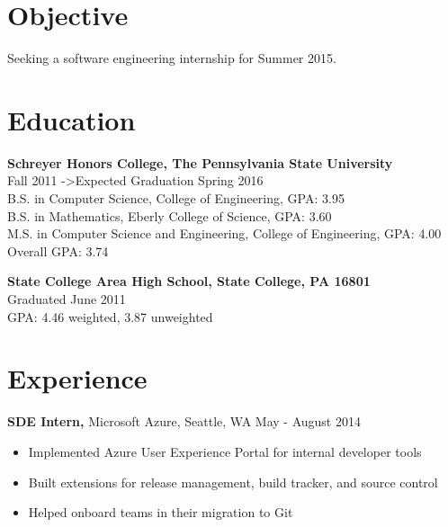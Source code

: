 \documentclass[margin]{res}
\begin{document}
 
\address{{\bf Present Address} \\ 9052 E Shorewood Dr \\ Apartment 255 \\ Mercer Island, WA 98040 \\
        (814) 574-8768 }
\address{{\bf Permanent Address} \\ 3144 Williamsburg Court \\ State College, PA 16801 \\ (814) 574-0111 \\ douglasjordan0@gmail.com } 
\begin{resume} 
 
\section{Objective} 
Seeking a software engineering internship for Summer 2015.

\section{Education} 
{\bf Schreyer Honors College, The Pennsylvania State University} \\
Fall 2011 -\textgreater Expected Graduation Spring 2016 \\
B.S. in Computer Science, College of Engineering, GPA: 3.95 \\
B.S. in Mathematics, Eberly College of Science, GPA: 3.60 \\
M.S. in Computer Science and Engineering, College of Engineering, GPA: 4.00 \\
Overall GPA: 3.74

{\bf State College Area High School, State College, PA 16801} \\
Graduated June 2011 \\
GPA: 4.46 weighted, 3.87 unweighted

\section{Experience}

{\bf SDE Intern,} Microsoft Azure, Seattle, WA \hfill May - August 2014
\begin{itemize} \itemsep -2pt  %
\item Implemented Azure User Experience Portal for internal developer tools
\item Built extensions for release management, build tracker, and source control
\item Helped onboard teams in their migration to Git
\end{itemize}


\end{resume}
\end{document}
